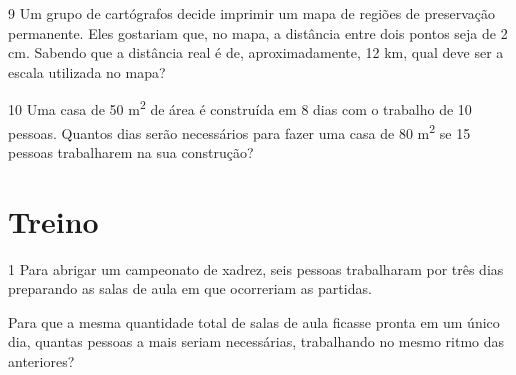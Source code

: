 \begin{emptybox}
\end{emptybox}

\pagebreak
\num{9} Um grupo de cartógrafos decide imprimir um mapa de regiões de
preservação permanente. Eles gostariam que, no mapa, a distância entre
dois pontos seja de 2 cm. Sabendo que a distância real é de,
aproximadamente, 12 km, qual deve ser a escala utilizada no mapa?


\num{10} Uma casa de 50 m\textsuperscript{2} de área é construída em 8 dias 
com o trabalho de 10 pessoas. Quantos dias serão necessários para fazer uma 
casa de 80 m\textsuperscript{2} se 15 pessoas trabalharem na sua construção?

\begin{emptybox}
\end{emptybox}

\section{Treino}

\num{1} Para abrigar um campeonato de xadrez, seis pessoas trabalharam por 
três dias preparando as salas de aula em que ocorreriam as partidas.

Para que a mesma quantidade total de salas de aula ficasse pronta em um
único dia, quantas pessoas a mais seriam necessárias, trabalhando no mesmo 
ritmo das anteriores?

